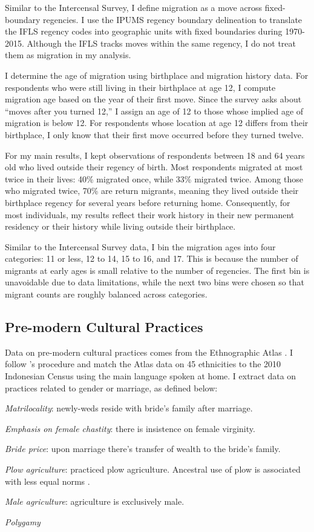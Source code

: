 Similar to the Intercensal Survey, I define migration as a move across fixed-boundary regencies. I use the IPUMS regency boundary delineation to translate the IFLS regency codes into geographic units with fixed boundaries during 1970-2015. Although the IFLS tracks moves within the same regency, I do not treat them as migration in my analysis.

I determine the age of migration using birthplace and migration history data. For respondents who were still living in their birthplace at age 12, I compute migration age based on the year of their first move. Since the survey asks about ``moves after you turned 12,'' I assign an age of 12 to those whose implied age of migration is below 12. For respondents whose location at age 12 differs from their birthplace, I only know that their first move occurred before they turned twelve.

For my main results, I kept observations of respondents between 18 and 64 years old who lived outside their regency of birth. Most respondents migrated at most twice in their lives: 40\% migrated once, while 33\% migrated twice. Among those who migrated twice, 70\% are return migrants, meaning they lived outside their birthplace regency for several years before returning home. Consequently, for most individuals, my results reflect their work history in their new permanent residency or their history while living outside their birthplace. 

Similar to the Intercensal Survey data, I bin the migration ages into four categories: 11 or less,   12 to 14, 15 to 16, and 17. This is because the number of migrants at early ages is small relative to the number of regencies. The first bin is unavoidable due to data limitations, while the next two bins were chosen so that migrant counts are roughly balanced across categories.

\subsection{Pre-modern Cultural Practices}
\label{sec:eth_atlas}
Data on pre-modern cultural practices comes from the Ethnographic Atlas \citep{Murdock1967}. I follow \cite{Bau}'s procedure and match the Atlas data on 45 ethnicities to the 2010 Indonesian Census using the main language spoken at home. I extract data on practices related to gender or marriage, as defined below:
\bitem
\item \textit{Matrilocality}: newly-weds reside with bride's family after marriage.
\item \textit{Emphasis on female chastity}: there is insistence on female virginity.
\item \textit{Bride price}: upon marriage there's transfer of wealth to the bride's family.
\item \textit{Plow agriculture}: practiced plow agriculture. Ancestral use of plow is associated with less equal norms \citep{AlesinaPaolaGiulianoNathanNunn2013}.
\item \textit{Male agriculture}: agriculture is exclusively male.
\item \textit{Polygamy}
\eitem 

